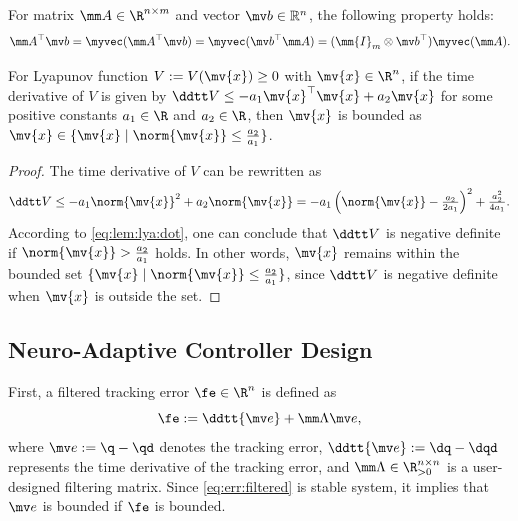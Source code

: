 \documentclass[journal]{IEEEtran}
\begin{document}
\begin{propsit} \label{propsit:kron}
	For matrix $\mm A\in\R^{n\times m}$ and vector $\mv b\in\mathbb R^n$, the following property holds:
	\begin{equation}
		\mm A^\top \mv b 
		= 
		\myvec(\mm A^\top\mv b)
		=
		\myvec(\mv b^\top\mm A)
		= 
		(\mm{I}_{m}\otimes \mv b^\top) \myvec(\mm A)
		.
	\end{equation}
\end{propsit}


\begin{lem} \label{lem:stable:set}
    For Lyapunov function $V:=V(\mv{x})\ge0$ with $\mv{x}\in\R^n$, if the time derivative of $V$ is given by $\ddtt V\le -a_1 \mv{x}^\top \mv{x} + a_2 \mv{x}$ for some positive constants $a_1\in\R$ and $a_2\in\R$, then $\mv{x}$ is bounded as $\mv{x}\in\{\mv{x}\mid\norm{\mv{x}}\le\tfrac{a_2}{a_1}\}$.
\end{lem}

\begin{proof}
    The time derivative of $V$ can be rewritten as
    \begin{equation}
        \ddtt V
        \le
        -a_1 \norm{\mv{x}}^2 + a_2 \norm{\mv{x}}
        =
        -a_1
        \left(
            \norm{\mv{x}}-\tfrac{a_2}{2a_1}
        \right)^2
        +
        \tfrac{a_2^2}{4a_1}
        .
        \label{eq:lem:lya:dot}
    \end{equation}
    According to \eqref{eq:lem:lya:dot}, one can conclude that $\ddtt V$ is negative definite if $\norm{\mv{x}}>\tfrac{a_2}{a_1}$ holds.
    In other words, $\mv{x}$ remains within the bounded set $\{\mv{x}\mid\norm{\mv{x}}\le\tfrac{a_2}{a_1}\}$, since $\ddtt V$ is negative definite when $\mv{x}$ is outside the set.
\end{proof}


\subsection{Neuro-Adaptive Controller Design}\label{sec:sub:NAC}

First, a filtered tracking error $\fe\in\R^n$ is defined as 
\begin{equation}
    \fe := \ddtt{\mv e}+\mm\Lambda \mv e
    ,
    \label{eq:err:filtered}
\end{equation}
where $\mv e := \q - \qd$ denotes the tracking error, $\ddtt{\mv e} := \dq - \dqd$ represents the time derivative of the tracking error, and $\mm\Lambda\in\R^{n\times n}_{>0}$ is a user-designed filtering matrix.
Since \eqref{eq:err:filtered} is stable system, it implies that $\mv e$ is bounded if $\fe$ is bounded.
\end{document}

